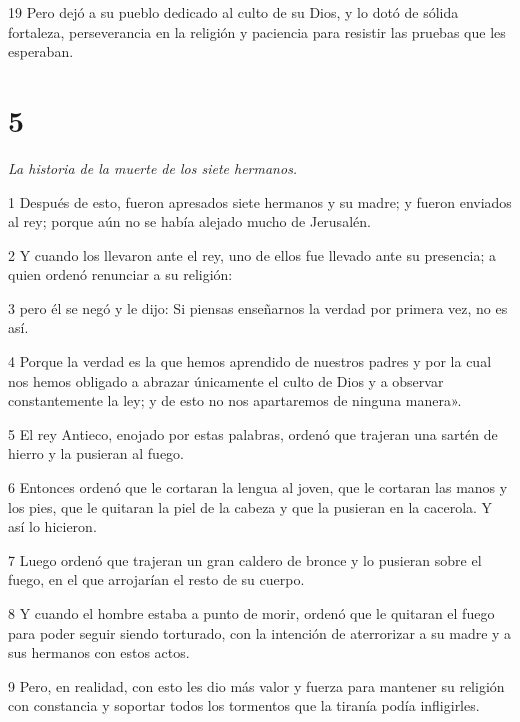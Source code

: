 \par 19 Pero dejó a su pueblo dedicado al culto de su Dios, y lo dotó de sólida fortaleza, perseverancia en la religión y paciencia para resistir las pruebas que les esperaban.

\chapter{5}

\par \textit{La historia de la muerte de los siete hermanos.}

\par 1 Después de esto, fueron apresados ​​siete hermanos y su madre; y fueron enviados al rey; porque aún no se había alejado mucho de Jerusalén.

\par 2 Y cuando los llevaron ante el rey, uno de ellos fue llevado ante su presencia; a quien ordenó renunciar a su religión:

\par 3 pero él se negó y le dijo: Si piensas enseñarnos la verdad por primera vez, no es así.

\par 4 Porque la verdad es la que hemos aprendido de nuestros padres y por la cual nos hemos obligado a abrazar únicamente el culto de Dios y a observar constantemente la ley; y de esto no nos apartaremos de ninguna manera».

\par 5 El rey Antieco, enojado por estas palabras, ordenó que trajeran una sartén de hierro y la pusieran al fuego.

\par 6 Entonces ordenó que le cortaran la lengua al joven, que le cortaran las manos y los pies, que le quitaran la piel de la cabeza y que la pusieran en la cacerola. Y así lo hicieron.

\par 7 Luego ordenó que trajeran un gran caldero de bronce y lo pusieran sobre el fuego, en el que arrojarían el resto de su cuerpo.

\par 8 Y cuando el hombre estaba a punto de morir, ordenó que le quitaran el fuego para poder seguir siendo torturado, con la intención de aterrorizar a su madre y a sus hermanos con estos actos.

\par 9 Pero, en realidad, con esto les dio más valor y fuerza para mantener su religión con constancia y soportar todos los tormentos que la tiranía podía infligirles.

